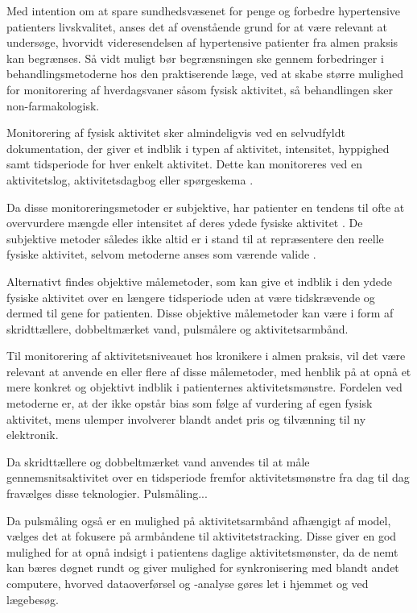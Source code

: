 Med intention om at spare sundhedsvæsenet for penge og forbedre hypertensive patienters livskvalitet, anses det af ovenstående grund for at være relevant at undersøge, hvorvidt videresendelsen af hypertensive patienter fra almen praksis kan begrænses. Så vidt muligt bør begrænsningen ske gennem forbedringer i behandlingsmetoderne hos den praktiserende læge, ved at skabe større mulighed for monitorering af hverdagsvaner såsom fysisk aktivitet, så behandlingen sker non-farmakologisk.

Monitorering af fysisk aktivitet sker almindeligvis ved en selvudfyldt dokumentation, der giver et indblik i typen af aktivitet, intensitet, hyppighed samt tidsperiode for hver enkelt aktivitet. Dette kan monitoreres ved en aktivitetslog, aktivitetsdagbog eller spørgeskema \citep{adamo2009}. 

Da disse monitoreringsmetoder er subjektive, har patienter en tendens til ofte at overvurdere mængde eller intensitet af deres ydede fysiske aktivitet \citep{adamo2009}. De subjektive metoder således ikke altid er i stand til at repræsentere den reelle fysiske aktivitet, selvom metoderne anses som værende valide \citep{pedersen2011, motionsraad2007}. 

Alternativt findes objektive målemetoder, som kan give et indblik i den ydede fysiske aktivitet over en længere tidsperiode uden at være tidskrævende og dermed til gene for patienten. Disse objektive målemetoder kan være i form af skridttællere, dobbeltmærket vand, pulsmålere og aktivitetsarmbånd.


Til monitorering af aktivitetsniveauet hos kronikere i almen praksis, vil det være relevant at anvende en eller flere af disse målemetoder, med henblik på at opnå et mere konkret og objektivt indblik i patienternes aktivitetsmønstre. Fordelen ved metoderne er, at der ikke opstår bias som følge af vurdering af egen fysisk aktivitet, mens ulemper involverer blandt andet pris og tilvænning til ny elektronik. 

Da skridttællere og dobbeltmærket vand anvendes til at måle gennemsnitsaktivitet over en tidsperiode fremfor aktivitetsmønstre fra dag til dag fravælges disse teknologier. 
Pulsmåling...


Da pulsmåling også er en mulighed på aktivitetsarmbånd afhængigt af model, vælges det at fokusere på armbåndene til aktivitetstracking. Disse giver en god mulighed for at opnå indsigt i patientens daglige aktivitetsmønster, da de nemt kan bæres døgnet rundt og giver mulighed for synkronisering med blandt andet computere, hvorved dataoverførsel og -analyse gøres let i hjemmet og ved lægebesøg.
